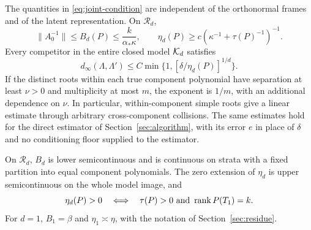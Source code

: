 \begin{theorem}\label{thm:joint}
The quantities in \eqref{eq:joint-condition} are independent of the
orthonormal frames and of the latent representation. On $\mathcal R_d$,
\begin{equation}\label{eq:joint-comparison}
 \|A_0^{-1}\|\le B_d(P)\le \frac{k}{\alpha_*\kappa},\qquad
 \eta_d(P)\ge c(\kappa^{-1}+\tau(P)^{-1})^{-1}.
\end{equation}
Every competitor in the entire closed model $\mathcal K_d$ satisfies
\begin{equation}\label{eq:joint-inverse}
 d_\infty(\Lambda,\Lambda')
 \le C\min\{1,[\delta/\eta_d(P)]^{1/d}\}.
\end{equation}
If the distinct roots within each true component polynomial have
separation at least $\nu>0$ and multiplicity at most $m$, the exponent
is $1/m$, with an additional dependence on $\nu$. In particular,
within-component simple roots give a linear estimate through arbitrary
cross-component collisions. The same estimates hold for the direct
estimator of Section~\ref{sec:algorithm}, with its error $e$ in place
of $\delta$ and no conditioning floor supplied to the estimator.

On $\mathcal R_d$, $B_d$ is lower semicontinuous and is continuous on
strata with a fixed partition into equal component polynomials.
The zero extension of $\eta_d$ is upper semicontinuous on the whole
model image, and
\[
 \eta_d(P)>0\quad\Longleftrightarrow\quad
 \tau(P)>0\ \hbox{and}\ \operatorname{rank} P(T_1)=k.
\]
For $d=1$, $B_1=\beta$ and $\eta_1\asymp\eta$, with the notation of
Section~\ref{sec:residue}.
\end{theorem}

